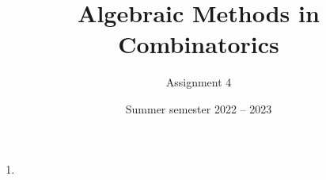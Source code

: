 \documentclass[kulak]{tplt}
\title{Algebraic Methods in Combinatorics}
\author{Assignment 4}
\date{Summer semester 2022 -- 2023}
\theoremstyle{definition}
\begin{document}
\maketitle
\begin{enumerate}
\item 

\end{enumerate}
\end{document}
